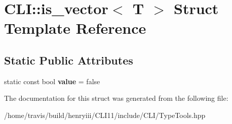 \hypertarget{struct_c_l_i_1_1is__vector}{}\section{C\+LI\+:\+:is\+\_\+vector$<$ T $>$ Struct Template Reference}
\label{struct_c_l_i_1_1is__vector}
\subsection*{Static Public Attributes}
\begin{DoxyCompactItemize}
\item 
\mbox{\label{struct_c_l_i_1_1is__vector_a58b2d10b867ddfd6a71a70497fa20a19}} 
static const bool {\bfseries value} = false
\end{DoxyCompactItemize}


The documentation for this struct was generated from the following file\+:\begin{DoxyCompactItemize}
\item 
/home/travis/build/henryiii/\+C\+L\+I11/include/\+C\+L\+I/Type\+Tools.\+hpp\end{DoxyCompactItemize}
